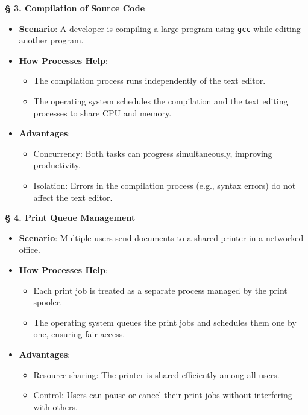 \documentclass[a4paper]{book}
\newcommand{\sfbf}[1]{{\normalsize\textsf{\textbf{§ #1}}}}
\begin{document}
\sfbf{3. Compilation of Source Code}

\begin{itemize}
\item 
\textbf{Scenario}: A developer is compiling a large program using \verb|gcc| while editing another program.

\item 
\textbf{How Processes Help}:
\begin{itemize}
\item 
The compilation process runs independently of the text editor.

\item 
The operating system schedules the compilation and the text editing processes to share CPU and memory.

\end{itemize}

\item 
\textbf{Advantages}:
\begin{itemize}
\item 
Concurrency: Both tasks can progress simultaneously, improving productivity.

\item 
Isolation: Errors in the compilation process (e.g., syntax errors) do not affect the text editor.

\end{itemize}

\end{itemize}
\hrulefill

\sfbf{4. Print Queue Management}

\begin{itemize}
\item 
\textbf{Scenario}: Multiple users send documents to a shared printer in a networked office.

\item 
\textbf{How Processes Help}:
\begin{itemize}
\item 
Each print job is treated as a separate process managed by the print spooler.

\item 
The operating system queues the print jobs and schedules them one by one, ensuring fair access.

\end{itemize}

\item 
\textbf{Advantages}:
\begin{itemize}
\item 
Resource sharing: The printer is shared efficiently among all users.

\item 
Control: Users can pause or cancel their print jobs without interfering with others.

\end{itemize}

\end{itemize}
\end{document}
